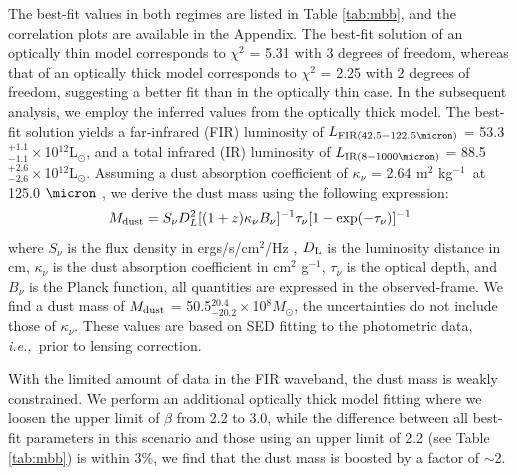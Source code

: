 \documentclass[twocolumn,apj,numberedappendix]{emulateapj}
\newcommand{\Msun}{\mbox{$M_{\odot}$}}
\newcommand{\Lsun}{\mbox{L$_{\odot}$}}
\newcommand{\ie}{{\sl i.e.,~}}
\newcommand{\pmOne}{$^{-1}$}
\begin{document}

The best-fit values in both regimes are listed in Table \ref{tab:mbb}, and the correlation plots are available in the Appendix. The best-fit solution of an optically thin
model corresponds to $\chi^2$ = 5.31 with 3 degrees of freedom, whereas that of an optically thick model
corresponds to $\chi^2$ = 2.25 with 2 degrees of freedom, suggesting a better fit than in the optically thin
case. In the subsequent analysis, we employ the inferred values from the optically thick model.
The best-fit solution yields a far-infrared (FIR) luminosity of $L_{\rm FIR (42.5-122.5\micron)}$ = 53.3$^{+1.1}_{-1.1}\times$10$^{12}$\Lsun, and a total infrared (IR) luminosity of $L_{\rm IR (8-1000 \micron)}$ = 88.5$^{+2.6}_{-2.6}\times$10$
^{12}$\Lsun. Assuming a dust absorption coefficient of $\kappa_{\nu}$ = 2.64 m$^2$ kg\pmOne\ at 125.0 $
\micron$ \citep{Dunne03a}, we derive the dust mass using the following expression:
\begin{equation}
M_{\rm dust} = S_{\nu} D_{L}^2 [(1 + z) \kappa_{\nu} B_{\nu}]^{-1} \tau_{\nu} [1-
\exp(-\tau_{\nu})]^{-1}
\end{equation}
where $S_{\nu}$ is the flux density in ergs/s/cm$^{2}$/Hz , $D_{\rm L}$ is the luminosity distance in cm, $\kappa_{\nu}$ is the dust
absorption coefficient in cm$^2$ g\pmOne, $\tau_{\nu}$ is the optical depth, and $B_{\nu}$ is the Planck function,
all quantities are expressed in the observed-frame. We find a dust mass of $M_{\rm dust}$ =
50.5$^{20.4}_{-20.2}\times$10$^8$\Msun, the uncertainties do not include those of $\kappa_{\nu}$. These values are based on SED fitting to the photometric data, \ie prior
to lensing correction. 

With the limited amount of data in the FIR waveband, the dust mass is weakly constrained. 
We perform an additional optically thick model fitting where we loosen the upper limit of $\beta$ from 2.2 to 3.0, while the difference between all best-fit parameters in this scenario and those using an upper limit of 2.2 (see Table \ref{tab:mbb}) is within 3\%, we find that the dust mass is boosted by a factor of $\sim$2. 
\end{document}
